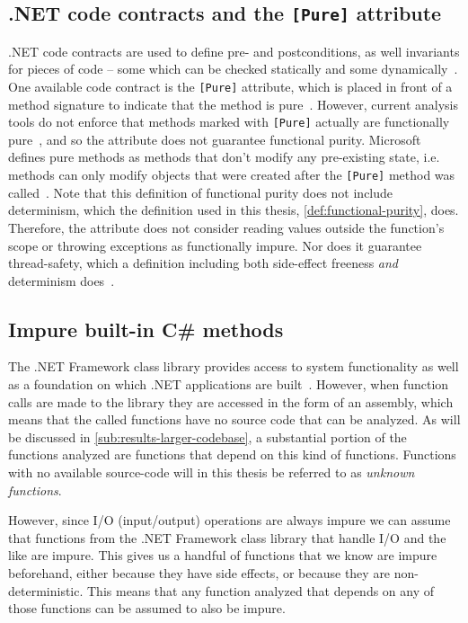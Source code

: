 \documentclass[a4paper,12pt]{article}
\begin{document}
\subsection{.NET code contracts and the \texttt{[Pure]} attribute} \label{sub:code-contracts}

.NET code contracts are used to define pre- and postconditions, as well invariants for pieces of code -- some which can be checked statically and some dynamically~\cite{microsoft-code-contracts}. One available code contract is the \texttt{[Pure]} attribute, which is placed in front of a method signature to indicate that the method is pure~\cite{microsoft-code-contracts}. However, current analysis tools do not enforce that methods marked with \texttt{[Pure]} actually are functionally pure~\cite{microsoft-pure-attribute}, and so the attribute does not guarantee functional purity. Microsoft defines pure methods as methods that don't modify any pre-existing state, i.e. methods can only modify objects that were created after the \texttt{[Pure]} method was called~\cite{microsoft-code-contracts}. Note that this definition of functional purity does not include determinism, which the definition used in this thesis, \autoref{def:functional-purity}, does. Therefore, the attribute does not consider reading values outside the function's scope or throwing exceptions as functionally impure. Nor does it guarantee thread-safety, which a definition including both side-effect freeness \textit{and} determinism does~\cite{purity-in-java}.

\subsection{Impure built-in C\# methods} \label{sub:Impure-built-in-methods}

The .NET Framework class library provides access to system functionality as well as a foundation on which .NET applications are built~\cite{microsoft-dotnet-class-library}. However, when function calls are made to the library they are accessed in the form of an assembly, which means that the called functions have no source code that can be analyzed. As will be discussed in \autoref{sub:results-larger-codebase}, a substantial portion of the functions analyzed are functions that depend on this kind of functions. Functions with no available source-code will in this thesis be referred to as \textit{unknown functions}.

However, since I/O (input/output) operations are always impure we can assume that functions from the .NET Framework class library that handle I/O and the like are impure. This gives us a handful of functions that we know are impure beforehand, either because they have side effects, or because they are non-deterministic. This means that any function analyzed that depends on any of those functions can be assumed to also be impure.
\end{document}
